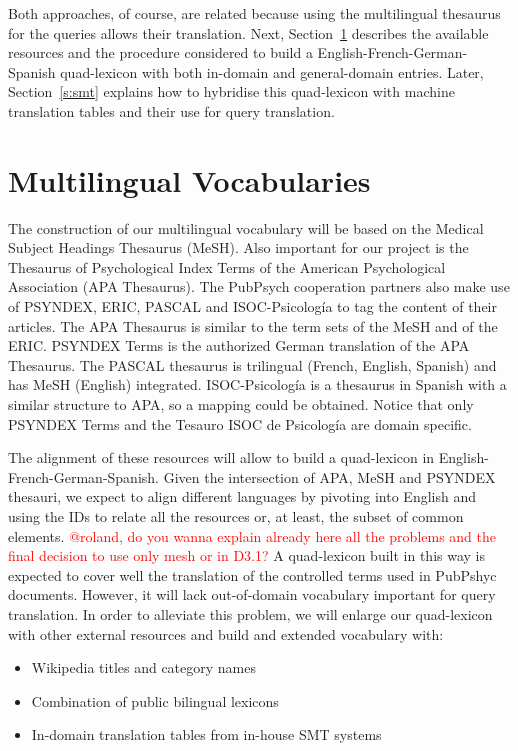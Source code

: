 \documentclass[a4paper,11pt]{article}
\newcommand{\red}[1]{\textcolor{red}{#1}}
\begin{document}
Both approaches, of course, are related because using the multilingual thesaurus for the queries allows their translation.
Next, Section~\ref{s:vocab} describes the available resources and the procedure considered to build a English-French-German-Spanish quad-lexicon with both in-domain and general-domain entries. Later, Section~\ref{s:smt} explains how to hybridise this quad-lexicon with machine translation tables and their use for query translation.


\section{Multilingual Vocabularies}
\label{s:vocab}

The construction of our multilingual vocabulary will be based on the Medical Subject Headings Thesaurus (MeSH). Also important for our project is the Thesaurus of Psychological Index Terms of the American Psychological Association (APA Thesaurus). The PubPsych cooperation partners also make use of PSYNDEX, ERIC, PASCAL and ISOC-Psicolog\'ia to tag the content of their articles. The APA Thesaurus is similar to the term sets of the MeSH and of the ERIC. PSYNDEX Terms is the authorized German translation of the APA Thesaurus. The PASCAL thesaurus is trilingual (French, English, Spanish) and has MeSH (English) integrated. ISOC-Psicolog\'ia is a thesaurus in Spanish with a similar structure to APA, so a mapping could be obtained. Notice that only PSYNDEX Terms and the Tesauro ISOC de Psicolog\'ia are domain specific.  

The alignment of these resources will allow to build a quad-lexicon in English-French-German-Spanish. Given the intersection of APA, MeSH and PSYNDEX thesauri, we expect to align different languages by pivoting into English and using the IDs to relate all the resources or, at least, the subset of common elements. \red{@roland, do you wanna explain already here all the problems and the final decision to use only mesh or in D3.1?} A quad-lexicon built in this way is expected to cover well the translation of the controlled terms used in PubPshyc documents. However, it will lack out-of-domain vocabulary important for query translation. In order to alleviate this problem, we will enlarge our quad-lexicon with other external resources and build and extended vocabulary with:

\begin{itemize}
 \item Wikipedia titles and category names
 \item Combination of public bilingual lexicons
 \item In-domain translation tables from in-house SMT systems 
\end{itemize}
\end{document}
